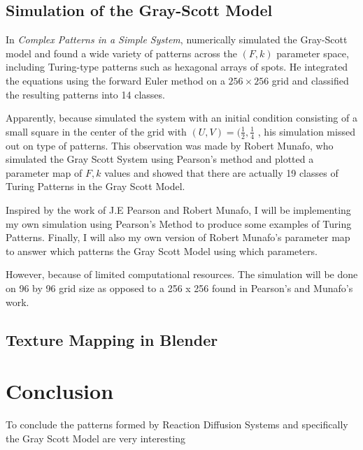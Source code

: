 \documentclass[a4paper, 11pt]{article}
\begin{document}
\subsection{Simulation of the Gray-Scott Model} 

In \textit{Complex Patterns in a Simple System}, \textcite{pearson1993} numerically simulated the Gray-Scott model and found a wide variety of patterns across the
$(F, k)$ parameter space, including Turing-type patterns such as hexagonal arrays of
spots. He integrated the equations using the forward Euler method on a
$256 \times 256$ grid and classified the resulting patterns into 14 classes. 

Apparently, because \parencite{pearson1993} simulated the system with an initial condition consisting of a small square in the center of the grid with $(U, V) = (\frac{1}{2}, \frac{1}{4}$ , his simulation missed out on type of patterns. This observation was made by Robert Munafo, who simulated the Gray Scott System using Pearson's method and plotted a parameter map of $F, k$ values and showed that there are actually 19 classes of Turing Patterns in the Gray Scott Model.  

Inspired by the work of J.E Pearson and Robert Munafo, I will be implementing my own simulation using Pearson's Method to produce some examples of Turing Patterns. Finally, I will also my own version of Robert Munafo's parameter map to answer which patterns the Gray Scott Model using which parameters. 

However, because of limited computational resources. The simulation will be done on 96 by 96 grid size as opposed to a 256 x 256 found in Pearson's and Munafo's work. 

\label{sec:parameter-map}
\label{sec:numerical}
\subsection{Texture Mapping in Blender}



\section{Conclusion}
\label{sec:conclusion}
To conclude the patterns formed by Reaction Diffusion Systems and specifically the Gray Scott Model are very interesting
\end{document}
